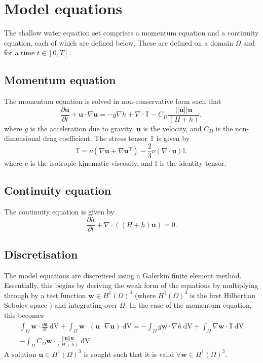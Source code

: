 \documentclass[a4paper,11pt]{report}
\begin{document}
\section{Model equations}
The shallow water equation set comprises a momentum equation and a continuity equation, each of which are defined below. These are defined on a domain $\Omega$ and for a time $t \in [0, T]$.

\subsection{Momentum equation}
The momentum equation is solved in non-conservative form such that
\begin{equation}
   \frac{\partial \mathbf{u}}{\partial t} + \mathbf{u}\cdot\nabla\mathbf{u} = -g\nabla h + \nabla\cdot\mathbb{T} - C_D\frac{||\mathbf{u}||\mathbf{u}}{(H + h)},
\end{equation}
where $g$ is the acceleration due to gravity, $\mathbf{u}$ is the velocity, and $C_D$ is the non-dimensional drag coefficient. The stress tensor $\mathbb{T}$ is given by 
\begin{equation}
   \mathbb{T} = \nu\left(\nabla\mathbf{u} + \nabla\mathbf{u}^{\mathrm{T}}\right) - \frac{2}{3}\nu\left(\nabla\cdot\mathbf{u}\right)\mathbb{I},
\end{equation}
where $\nu$ is the isotropic kinematic viscosity, and $\mathbb{I}$ is the identity tensor.

\subsection{Continuity equation}
The continuity equation is given by
\begin{equation}
   \frac{\partial h}{\partial t} + \nabla\cdot\left(\left(H + h\right)\mathbf{u}\right) = 0.
\end{equation}

\subsection{Discretisation}
The model equations are discretised using a Galerkin finite element method. Essentially, this begins by deriving the weak form of the equations by multiplying through by a test function $\mathbf{w} \in H^1(\Omega)^3$ (where $H^1(\Omega)^3$ is the first Hilbertian Sobolev space \citep{Elman_etal_2005}) and integrating over $\Omega$. In the case of the momentum equation, this becomes
\begin{eqnarray}
   \nonumber\int_{\Omega}\mathbf{w}\cdot\frac{\partial \mathbf{u}}{\partial t}\ \mathrm{dV} + \int_{\Omega}\mathbf{w}\cdot(\mathbf{u}\cdot\nabla\mathbf{u}) \ \mathrm{dV} = -\int_{\Omega}g\mathbf{w}\cdot\nabla h \ \mathrm{dV} + \int_{\Omega}\nabla\mathbf{w}\cdot \mathbb{T} \ \mathrm{dV} \\- \int_{\Omega}C_D\mathbf{w}\cdot\frac{||\mathbf{u}||\mathbf{u}}{(H + h)} \ \mathrm{dV}.
\end{eqnarray}
A solution $\mathbf{u} \in H^1(\Omega)^3$ is sought such that it is valid $\forall \mathbf{w} \in H^1(\Omega)^3$.
\end{document}
